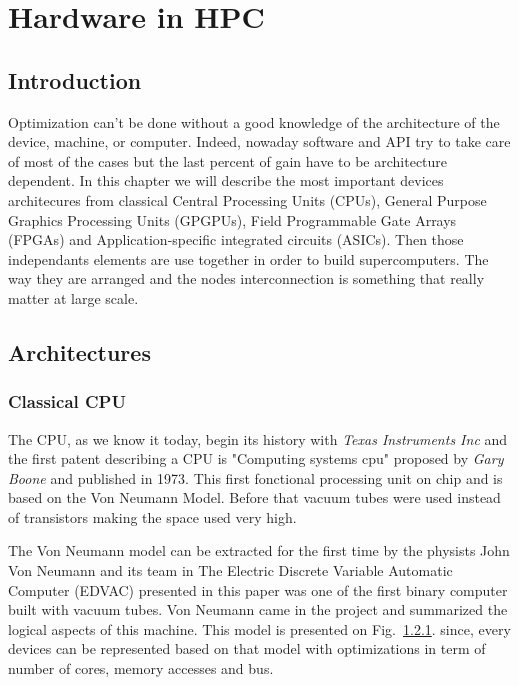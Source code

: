
\chapter{Hardware in HPC}



\section{Introduction}

Optimization can't be done without a good knowledge of the architecture of the device, machine, or computer. 
Indeed, nowaday software and API try to take care of most of the cases but the last percent of gain have to be architecture dependent. 
In this chapter we will describe the most important devices architecures from classical Central Processing Units (CPUs), General Purpose Graphics Processing Units (GPGPUs), Field Programmable Gate Arrays (FPGAs) and Application-specific integrated circuits (ASICs).
Then those independants elements are use together in order to build supercomputers. 
The way they are arranged and the nodes interconnection is something that really matter at large scale.  

\section{Architectures}
\subsection{Classical CPU}

The CPU, as we know it today, begin its history with \textit{Texas Instruments Inc} and the first patent describing a CPU is "Computing systems cpu" proposed by \textit{Gary Boone} and published in 1973.
This first fonctional processing unit on chip and is based on the Von Neumann Model.
Before that vacuum tubes were used instead of transistors making the space used very high.

The Von Neumann model can be extracted for the first time by the physists John Von Neumann and its team in \cite{} 
The Electric Discrete Variable Automatic Computer (EDVAC) presented in this paper was one of the first binary computer built with vacuum tubes. Von Neumann came in the project and summarized the logical aspects of this machine. 
This model is presented on Fig.~\ref{}.
since, every devices can be represented based on that model with optimizations in term of number of cores, memory accesses and bus. 

